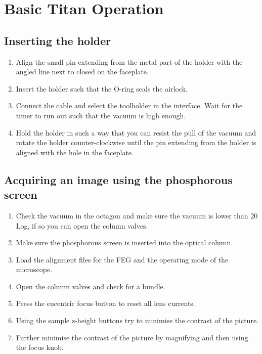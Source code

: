 \documentclass[a4paper]{scrartcl}
\begin{document}
\section*{Basic Titan Operation}

\subsection*{Inserting the holder}
\begin{enumerate}
	\item Align the small pin extending from the metal part of the holder with the angled line next to closed on the faceplate.
	\item Insert the holder such that the O-ring seals the airlock.
	\item Connect the cable and select the toolholder in the interface. Wait for the timer to run out such that the vacuum is high enough.
	\item Hold the holder in such a way that you can resist the pull of the vacuum and rotate the holder counter-clockwise until the pin extending from the holder is aligned with the hole in the faceplate.
\end{enumerate}


\subsection*{Acquiring an image using the phosphorous screen}
\begin{enumerate}
	\item Check the vacuum in the octagon and make sure the vacuum is lower than 20 Log, if so you can open the column valves.
	\item Make sure the phosphorous screen is inserted into the optical column.
	\item Load the alignment files for the FEG and the operating mode of the microscope.
	\item Open the column valves and check for a bundle.
	\item Press the eucentric focus button to reset all lens currents.
	\item Using the sample z-height buttons try to minimise the contrast of the picture.
	\item Further minimise the contrast of the picture by magnifying and then using the focus knob.
\end{enumerate}
\end{document}

